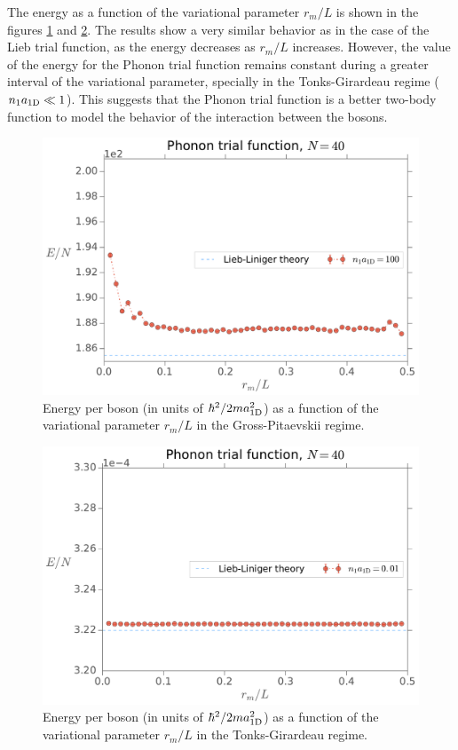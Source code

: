 %
The energy as a function of the variational parameter $r_m / L$ is shown in the
figures \ref{fig:phonon-energy-as-rm-n-a1d-100-nb-40} and
\ref{fig:phonon-energy-as-rm-n-a1d-0-dot-01-nb-40}. The results show a very
similar behavior as in the case of the Lieb trial function, as the energy
decreases as $r_m / L$ increases. However, the value of the energy for the
Phonon trial function remains constant during a greater interval of the
variational parameter, specially in the Tonks-Girardeau regime (${{n}_1}
a_{ \mathrm{1D} } \ll 1$). This suggests that the Phonon trial function is a better
two-body function to model the behavior of the interaction between the bosons.
%
\begin{figure}[h!]
	\centering
	\includegraphics[width=0.75\linewidth]{./figures/phonon_energy-as-rm_n-a1d-100_Nb-40}
	\caption{ Energy per boson (in units of $\hbar^2/2ma_{ \mathrm{1D} }^2$) as a function
		of the variational parameter $r_m / L$ in the Gross-Pitaevskii regime. }
	\label{fig:phonon-energy-as-rm-n-a1d-100-nb-40}
\end{figure}
%
\begin{figure}[h!]

	\centering
	\includegraphics[width=0.75\linewidth]{./figures/phonon_energy-as-rm_n-a1d-0-dot-01_Nb-40}
	\caption{ Energy per boson (in units of $\hbar^2/2ma_{ \mathrm{1D} }^2$) as a function
		of the variational parameter $r_m / L$ in the Tonks-Girardeau regime. }
	\label{fig:phonon-energy-as-rm-n-a1d-0-dot-01-nb-40}
\end{figure}
